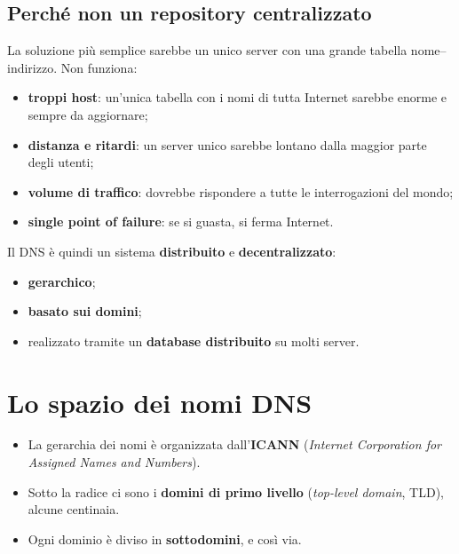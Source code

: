 \subsection{Perché non un repository centralizzato}

La soluzione più semplice sarebbe un unico server con una grande tabella nome--indirizzo. Non funziona:

\begin{itemize}
    \item \textbf{troppi host}: un'unica tabella con i nomi di tutta Internet sarebbe enorme e sempre da aggiornare;
    \item \textbf{distanza e ritardi}: un server unico sarebbe lontano dalla maggior parte degli utenti;
    \item \textbf{volume di traffico}: dovrebbe rispondere a tutte le interrogazioni del mondo;
    \item \textbf{single point of failure}: se si guasta, si ferma Internet.
\end{itemize}

Il DNS è quindi un sistema \textbf{distribuito} e \textbf{decentralizzato}:

\begin{itemize}
    \item \textbf{gerarchico};
    \item \textbf{basato sui domini};
    \item realizzato tramite un \textbf{database distribuito} su molti server.
\end{itemize}


\section{Lo spazio dei nomi DNS}

\begin{itemize}
    \item La gerarchia dei nomi è organizzata dall'\textbf{ICANN} (\emph{Internet Corporation for Assigned
          Names and Numbers}).
    \item Sotto la radice ci sono i \textbf{domini di primo livello} (\emph{top-level domain}, TLD), alcune
          centinaia.
    \item Ogni dominio è diviso in \textbf{sottodomini}, e così via.
\end{itemize}

